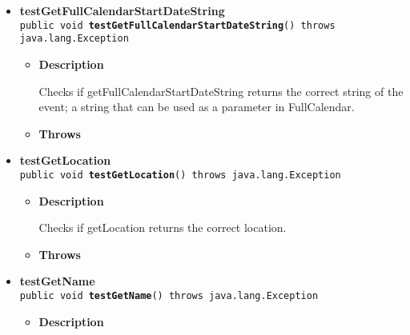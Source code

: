 \documentclass[11pt,a4paper]{report}
\begin{document}
{{{\begin{itemize}
{\begin{itemize}
{Checks if getFullCalendarEndDateString returns the correct string of the event; a string that can be used as a parameter in FullCalendar.
}
\item{{\bf  Throws}
}%
\end{itemize}
}%
\item{ 
{\bf  testGetFullCalendarStartDateString}\\
\texttt{public void\ {\bf  testGetFullCalendarStartDateString}() throws java.lang.Exception
\label{is.mpg.ruglan.test.CalEventTest.testGetFullCalendarStartDateString()}}%
\begin{itemize}
\item{
{\bf  Description}

Checks if getFullCalendarStartDateString returns the correct string of the event; a string that can be used as a parameter in FullCalendar.
}
\item{{\bf  Throws}
}%
\end{itemize}
}%
\item{ 
{\bf  testGetLocation}\\
\texttt{public void\ {\bf  testGetLocation}() throws java.lang.Exception
\label{is.mpg.ruglan.test.CalEventTest.testGetLocation()}}%
\begin{itemize}
\item{
{\bf  Description}

Checks if getLocation returns the correct location.
}
\item{{\bf  Throws}
}%
\end{itemize}
}%
\item{ 
{\bf  testGetName}\\
\texttt{public void\ {\bf  testGetName}() throws java.lang.Exception
\label{is.mpg.ruglan.test.CalEventTest.testGetName()}}%
\begin{itemize}
\item{
{\bf  Description}

}
\end{itemize}}
\end{itemize}}}}
\end{document}
